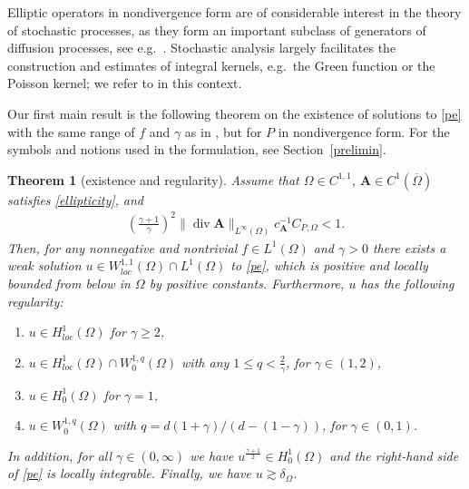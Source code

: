 \documentclass[12pt,a4paper]{amsart}
\newtheorem{theorem}{\bf Theorem}[section]
\theoremstyle{definition}
\newcommand{\A}{\mathbf{A}}
\newcommand*\Div{\operatorname{div}}
\begin{document}
Elliptic operators in nondivergence form are of considerable interest in the theory of stochastic processes, as they form an important subclass of generators of diffusion processes, see e.g.~\cite[Section~6.7.3]{MR2072890}. Stochastic analysis largely facilitates the construction and estimates of integral kernels, e.g.~the Green function or the Poisson kernel; we refer to \cite{MR4554661, MR842803} in this context.


\smallskip
Our first main result is the following theorem on the existence of solutions to \eqref{pe} with the same range of $f$ and $\gamma$ as in \cite{MR2592976}, but for $P$ in nondivergence form. For the symbols and notions used in the formulation, see Section~\ref{prelimin}.



\begin{theorem}[existence and regularity]\label{maintheorem} Assume that $\Omega \in C^{1,1}$, $\A\in C^{1}(\overline{\Omega})$ satisfies \eqref{ellipticity}, and 
\begin{align}\label{eq:smallA}
\left( \frac{\gamma + 1}{ \gamma} \right)^2 \lVert \Div \A \rVert_{L^\infty(\Omega)}c_{\A}^{-1} C_{P,\Omega} <1.
\end{align}
Then, for any nonnegative and nontrivial $f\in L^1(\Omega)$ and $\gamma > 0$
there exists a weak solution $u\in W^{1,1}_{loc}(\Omega)\cap L^1(\Omega)$ to \eqref{pe}, which is positive and locally bounded from below in $\Omega$ by positive constants. Furthermore, $u$ has the following regularity:
\begin{enumerate}[label={\rm \bf (\alph*)}]
    \item \label{item:gammageq2} $u\in H^1_{loc}(\Omega)$ for $\gamma\geq 2$,
    \item \label{item:gammain12} $u\in H^1_{loc}(\Omega) \cap W_{ 0}^{1,q}(\Omega)$ with any $1\le q < \frac{2}{\gamma}$, for $\gamma \in (1,2)$,
    \item \label{item:gamma1} $u\in H^1_0(\Omega)$ for $\gamma=1$,
    \item \label{item:gammaleq1} $u\in W^{1,q}_0(\Omega)$ with $q=d(1+\gamma)/(d-(1-\gamma))$, for $\gamma\in (0,1)$.
\end{enumerate}
In addition, for all $\gamma\in (0,\infty)$ we have
$u^{\frac{\gamma +1}{2}}\in H^1_0(\Omega)$ and
 the right-hand side of \eqref{pe} is locally integrable.  Finally, we have $u\gtrsim \delta_\Omega$.
\end{theorem}
\end{document}
